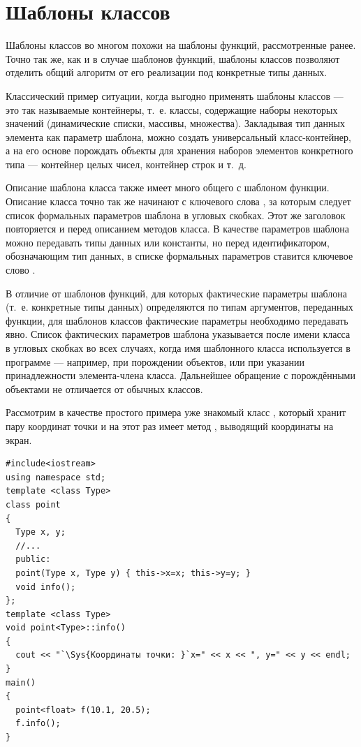 \section[Шаблоны классов]{Шаблоны классов}
Шаблоны классов во многом похожи на шаблоны функций, рассмотренные ранее. Точно так же, как и в
случае шаблонов функций, шаблоны классов позволяют отделить общий алгоритм от его реализации под
конкретные типы данных. 

Классический пример ситуации, когда выгодно применять шаблоны классов --- это так называемые контейнеры, т.~е. классы,
содержащие наборы некоторых значений (динамические списки, массивы, множества). Закладывая тип данных элемента как
параметр шаблона, можно создать универсальный класс-контейнер, а на его основе порождать объекты для хранения наборов
элементов конкретного типа --- контейнер целых чисел, контейнер строк и т.~д.

Описание шаблона класса также имеет много общего с шаблоном функции. Описание класса точно так же начинают с ключевого
слова , за которым следует список формальных параметров шаблона в угловых скобках. Этот
же заголовок повторяется и перед описанием методов класса. В качестве параметров шаблона можно передавать типы данных
или константы, но перед идентификатором, обозначающим тип данных, в списке формальных параметров ставится ключевое
слово .

В отличие от шаблонов функций, для которых фактические параметры шаблона (т.~е. конкретные типы данных) определяются по
типам аргументов, переданных функции, для шаблонов классов фактические параметры необходимо передавать явно. Список
фактических параметров шаблона указывается после имени класса в угловых скобках во всех случаях, когда имя шаблонного
класса используется в программе --- например, при порождении объектов, или при указании принадлежности элемента-члена
класса. Дальнейшее обращение с порождёнными объектами не отличается от обычных классов.

Рассмотрим в качестве простого примера уже знакомый класс , который хранит пару координат
точки и на этот раз имеет метод , выводящий координаты на экран.
\begin{lstlisting}
#include<iostream>
using namespace std;
template <class Type> 
class point 
{
  Type x, y;
  //...
  public:
  point(Type x, Type y) { this->x=x; this->y=y; }
  void info();
};
template <class Type>
void point<Type>::info() 
{
  cout << "`\Sys{Координаты точки: }`x=" << x << ", y=" << y << endl; 
}
main()
{
  point<float> f(10.1, 20.5);
  f.info();
}
\end{lstlisting}

